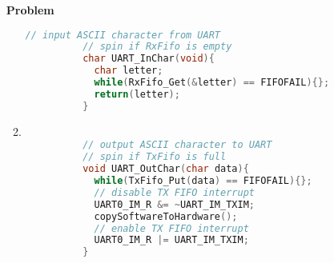 \documentclass[12pt]{article}
\newenvironment{Ex}{\textbf{Problem}\vspace{.75em}\\}{}
\begin{document}
\begin{enumerate}
\begin{Ex}
\begin{solution}
\begin{enumerate}
\begin{lstlisting}[language=C]
          // input ASCII character from UART
          // spin if RxFifo is empty
          char UART_InChar(void){
            char letter;
            while(RxFifo_Get(&letter) == FIFOFAIL){};
            return(letter);
          }
        \end{lstlisting}
      \item \hfill
        \begin{lstlisting}[language=C]

          // output ASCII character to UART
          // spin if TxFifo is full
          void UART_OutChar(char data){
            while(TxFifo_Put(data) == FIFOFAIL){};
            // disable TX FIFO interrupt
            UART0_IM_R &= ~UART_IM_TXIM;
            copySoftwareToHardware();
            // enable TX FIFO interrupt
            UART0_IM_R |= UART_IM_TXIM;
          }
        \end{lstlisting}


\end{enumerate}
\end{solution}
\end{Ex}
\end{enumerate}
\end{document}
